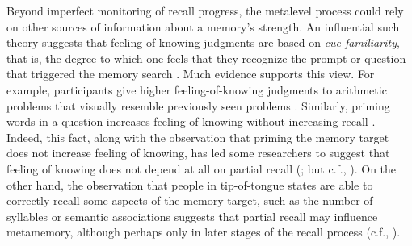 Beyond imperfect monitoring of recall progress, the metalevel process could rely on other sources of information about a memory's strength. An influential such theory suggests that feeling-of-knowing judgments are based on \emph{cue familiarity}, that is, the degree to which one feels that they recognize the prompt or question that triggered the memory search \citep{metcalfe1993cuefamiliarity}. Much evidence supports this view. For example, participants give higher feeling-of-knowing judgments to arithmetic problems that visually resemble previously seen problems \citep{reder1992determines}. Similarly, priming words in a question increases feeling-of-knowing without increasing recall \citep{reder1987strategy,reder1988strategic,schwartz1992cue}. Indeed, this fact, along with the observation that priming the memory target does not increase feeling of knowing, has led some researchers to suggest that feeling of knowing does not depend at all on partial recall (\citealp{reder1992determines,schwartz1992cue}; but c.f., \citealp{jameson1990influence,narens1994subthreshold}). On the other hand, the observation that people in tip-of-tongue states are able to correctly recall some aspects of the memory target, such as the number of syllables \citep{brown1966tip} or semantic associations \citep{koriat1993how,schacter1985attribute} suggests that partial recall may influence metamemory, although perhaps only in later stages of the recall process (c.f., \citealp{nhouyvanisvong1998rapid}).

